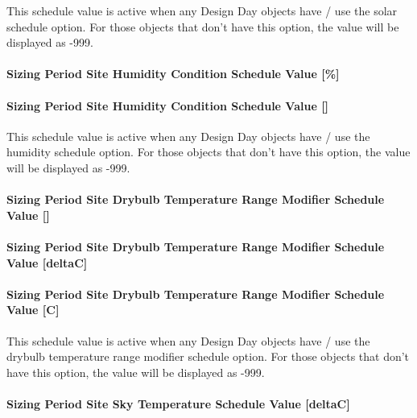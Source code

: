 This schedule value is active when any Design Day objects have / use the solar schedule option. For those objects that don't have this option, the value will be displayed as -999.

\paragraph{Sizing Period Site Humidity Condition Schedule Value {[}\%{]}}\label{sizing-period-site-humidity-condition-schedule-value}

\paragraph{Sizing Period Site Humidity Condition Schedule Value {[]}}\label{sizing-period-site-humidity-condition-schedule-value-1}

This schedule value is active when any Design Day objects have / use the humidity schedule option. For those objects that don't have this option, the value will be displayed as -999.

\paragraph{Sizing Period Site Drybulb Temperature Range Modifier Schedule Value {[]}}\label{sizing-period-site-drybulb-temperature-range-modifier-schedule-value}

\paragraph{Sizing Period Site Drybulb Temperature Range Modifier Schedule Value {[}deltaC{]}}\label{sizing-period-site-drybulb-temperature-range-modifier-schedule-value-deltac}

\paragraph{Sizing Period Site Drybulb Temperature Range Modifier Schedule Value {[}C{]}}\label{sizing-period-site-drybulb-temperature-range-modifier-schedule-value-c}

This schedule value is active when any Design Day objects have / use the drybulb temperature range modifier schedule option. For those objects that don't have this option, the value will be displayed as -999.

\paragraph{Sizing Period Site Sky Temperature Schedule Value {[}deltaC{]}}\label{sizing-period-site-sky-temperature-schedule-value-deltac}

